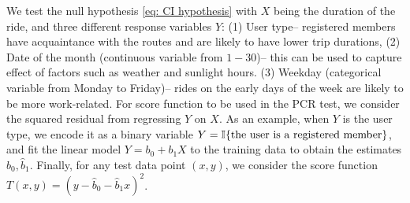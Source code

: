 \documentclass[11pt]{article}
\begin{document}


We test the null hypothesis \eqref{eq: CI hypothesis} with $X$ being the duration of the ride, and three different response variables $Y$: (1) User type-- registered members have acquaintance with the routes and are likely to have lower trip durations, (2) Date of the month (continuous variable from $1-30$)--  this can be used to capture effect of factors such as weather and sunlight hours. (3) Weekday (categorical variable from Monday to Friday)-- rides on the early days of the week are likely to be more work-related.  
For score function to be used in the PCR test, we consider the squared residual from regressing $Y$ on $X$. As an example, when $Y$ is the user type, we encode it  as a binary variable $Y={\mathbb I}{\{ \text{the user is a registered member}\}}$, and fit the linear model $Y=b_0+b_1X$ to the training data to obtain the estimates $\widehat{b}_0, \widehat{b}_1$. Finally, for any test data point $(x,y)$, we consider the score function $T(x,y)=(y-\widehat{b}_0-\widehat{b}_1x)^2$.
\end{document}
